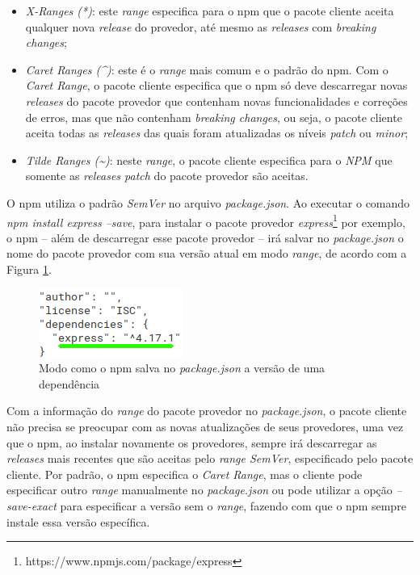 \begin{itemize}
    \item \textit{X-Ranges (*)}: este \textit{range} especifica para o \gls{npm} que o pacote cliente aceita qualquer nova \textit{release} do provedor, até mesmo as \textit{releases} com \textit{breaking changes};
    \item \textit{Caret Ranges (\textasciicircum)}: este é o \textit{range} mais comum e o padrão do \gls{npm}. Com o \textit{Caret Range}, o pacote cliente especifica que o \gls{npm} só deve descarregar novas \textit{releases} do pacote provedor que contenham novas funcionalidades e correções de erros, mas que não contenham \textit{breaking changes}, ou seja, o pacote cliente aceita todas as \textit{releases} das quais foram atualizadas os níveis \textit{patch} ou \textit{minor};
    \item \textit{Tilde Ranges (\textasciitilde)}: neste \textit{range}, o pacote cliente especifica para o \textit{NPM} que somente as \textit{releases patch} do pacote provedor são aceitas.
\end{itemize}{}

O \gls{npm} utiliza o padrão \textit{SemVer} no arquivo \textit{package.json}. Ao executar o comando \textit{npm install express --save}, para instalar o pacote provedor \textit{express}\footnote{https://www.npmjs.com/package/express} por exemplo, o \gls{npm} -- além de descarregar esse pacote provedor -- irá salvar no \textit{package.json} o nome do pacote provedor com sua versão atual em modo \textit{range}, de acordo com a Figura \ref{fig:dep_express}.

\begin{figure}
    \centering
    \includegraphics{figuras/dependencies_express.png}
    \caption{Modo como o \gls{npm} salva no \textit{package.json} a versão de uma dependência}
    \label{fig:dep_express}
\end{figure}{}

Com a informação do \textit{range} do pacote provedor no \textit{package.json}, o pacote cliente não precisa se preocupar com as novas atualizações de seus provedores, uma vez que o \gls{npm}, ao instalar novamente os provedores, sempre irá descarregar as \textit{releases} mais recentes que são aceitas pelo \textit{range SemVer}, especificado pelo pacote cliente. Por padrão, o \gls{npm} especifica o \textit{Caret Range}, mas o cliente pode especificar outro \textit{range} manualmente no \textit{package.json} ou pode utilizar a opção \textit{--save-exact} para especificar a versão sem o \textit{range}, fazendo com que o \gls{npm} sempre instale essa versão específica.


